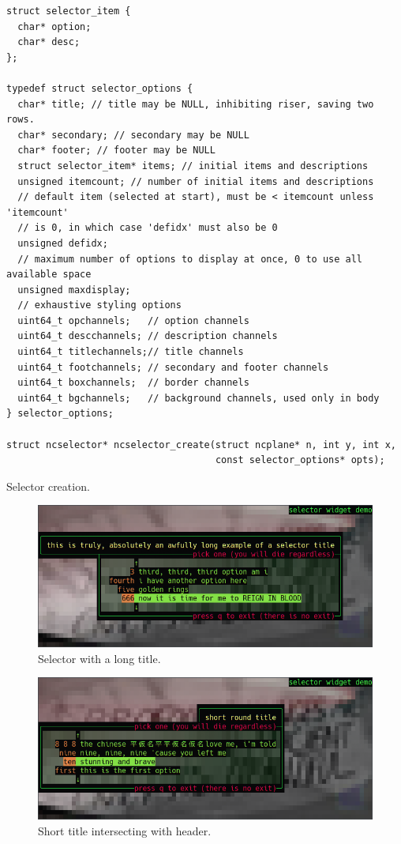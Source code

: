 \documentclass[letterpaper,10pt]{article}
\begin{document}
\begin{listing}[!htbp]
\begin{verbatim}
struct selector_item {
  char* option;
  char* desc;
};

typedef struct selector_options {
  char* title; // title may be NULL, inhibiting riser, saving two rows.
  char* secondary; // secondary may be NULL
  char* footer; // footer may be NULL
  struct selector_item* items; // initial items and descriptions
  unsigned itemcount; // number of initial items and descriptions
  // default item (selected at start), must be < itemcount unless 'itemcount'
  // is 0, in which case 'defidx' must also be 0
  unsigned defidx;
  // maximum number of options to display at once, 0 to use all available space
  unsigned maxdisplay;
  // exhaustive styling options
  uint64_t opchannels;   // option channels
  uint64_t descchannels; // description channels
  uint64_t titlechannels;// title channels
  uint64_t footchannels; // secondary and footer channels
  uint64_t boxchannels;  // border channels
  uint64_t bgchannels;   // background channels, used only in body
} selector_options;

struct ncselector* ncselector_create(struct ncplane* n, int y, int x,
                                     const selector_options* opts);
\end{verbatim}
\caption{Selector creation.}
\end{listing}

\begin{figure}
    \centering
    \includegraphics[width=.75\linewidth]{media/selector1.png}
    \caption{Selector with a long title.}
\end{figure}

\begin{figure}
    \centering
    \includegraphics[width=.75\linewidth]{media/selector2.png}
    \caption{Short title intersecting with header.}
\end{figure}
\end{document}
